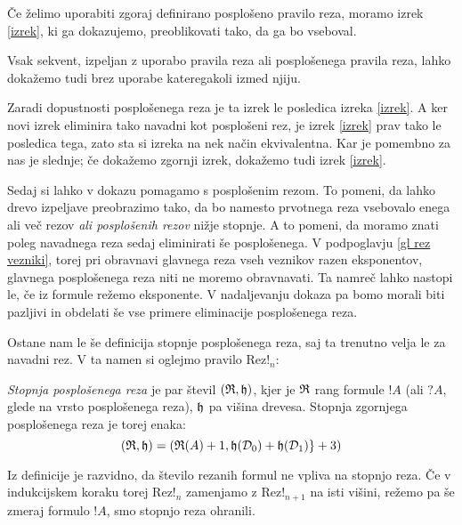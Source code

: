 Če želimo uporabiti zgoraj definirano posplošeno pravilo reza, moramo izrek \ref{izrek}, ki ga dokazujemo, preoblikovati tako, da ga bo vseboval.
\begin{izrek}
    Vsak sekvent, izpeljan z uporabo pravila reza ali posplošenega pravila reza, lahko dokažemo tudi brez uporabe kateregakoli izmed njiju.
\end{izrek}

Zaradi dopustnosti posplošenega reza je ta izrek le posledica izreka \ref{izrek}. A ker novi izrek eliminira tako navadni kot posplošeni rez, je izrek \ref{izrek} prav tako le posledica tega, zato sta si izreka na nek način ekvivalentna. Kar je pomembno za nas je slednje; če dokažemo zgornji izrek, dokažemo tudi izrek \ref{izrek}.

Sedaj si lahko v dokazu pomagamo s posplošenim rezom. To pomeni, da lahko drevo izpeljave preobrazimo tako, da bo namesto prvotnega reza vsebovalo enega ali več rezov \emph{ali posplošenih rezov} nižje stopnje. A to pomeni, da moramo znati poleg navadnega reza sedaj eliminirati še posplošenega. V podpoglavju \ref{gl rez vezniki}, torej pri obravnavi glavnega reza vseh veznikov razen eksponentov, glavnega posplošenega reza niti ne moremo obravnavati. Ta namreč lahko nastopi le, če iz formule režemo eksponente. V nadaljevanju dokaza pa bomo morali biti pazljivi in obdelati še vse primere eliminacije posplošenega reza.

Ostane nam le še definicija stopnje posplošenega reza, saj ta trenutno velja le za navadni rez. V ta namen si oglejmo pravilo Rez!$_n$:
\begin{prooftree}
\end{prooftree}

\begin{definicija}
    \emph{Stopnja posplošenega reza} je par števil $(\R,\h)$, kjer je $\R$ rang formule $!A$ (ali $?A$, glede na vrsto posplošenega reza), $\h$ pa višina drevesa. Stopnja zgornjega posplošenega reza je torej enaka:
    $$
        (\R,\h) = (\R(A) + 1, \h(\D_0) + \h(\D_1)\} + 3)
    $$
\end{definicija}
\begin{opomba}
    Iz definicije je razvidno, da število rezanih formul ne vpliva na stopnjo reza. Če v indukcijskem koraku torej Rez!$_n$ zamenjamo z Rez!$_{n+1}$ na isti višini, režemo pa še zmeraj formulo $!A$, smo stopnjo reza ohranili.
\end{opomba}

